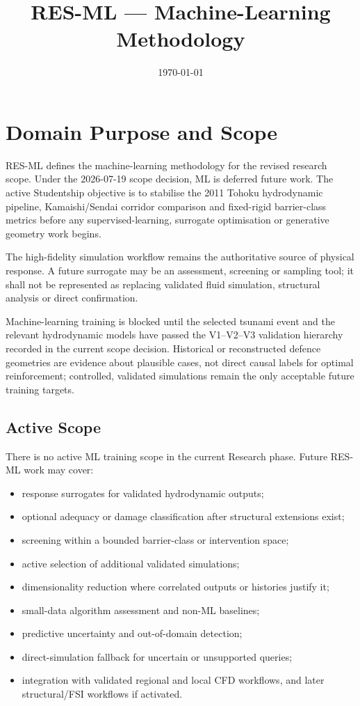 \documentclass[12pt,a4paper]{article}
\title{RES-ML --- Machine-Learning Methodology}
\author{}
\date{\today}
\begin{document}
\maketitle

\tableofcontents
\clearpage

\section{Domain Purpose and Scope}
\label{sec:res-ml-domain-purpose}

RES-ML defines the machine-learning methodology for the revised research
scope. Under the 2026-07-19 scope decision, ML is deferred future
work. The active Studentship objective is to stabilise the 2011
Tohoku hydrodynamic pipeline, Kamaishi/Sendai corridor comparison and
fixed-rigid barrier-class metrics before any supervised-learning,
surrogate optimisation or generative geometry work begins.

The high-fidelity simulation workflow remains the authoritative source of
physical response. A future surrogate may be an assessment, screening
or sampling tool; it shall not be represented as replacing validated
fluid simulation, structural analysis or direct confirmation.

Machine-learning training is blocked until the selected tsunami event and the
relevant hydrodynamic models have passed the V1--V2--V3 validation
hierarchy recorded in the current scope decision. Historical or
reconstructed defence geometries are evidence about plausible cases,
not direct causal labels for optimal reinforcement; controlled,
validated simulations remain the only acceptable future training
targets.

\subsection{Active Scope}
\label{sec:res-ml-active-scope}

There is no active ML training scope in the current Research phase.
Future RES-ML work may cover:
\begin{itemize}
  \item response surrogates for validated hydrodynamic outputs;
  \item optional adequacy or damage classification after structural
    extensions exist;
  \item screening within a bounded barrier-class or intervention space;
  \item active selection of additional validated simulations;
  \item dimensionality reduction where correlated outputs or histories justify
    it;
  \item small-data algorithm assessment and non-ML baselines;
  \item predictive uncertainty and out-of-domain detection;
  \item direct-simulation fallback for uncertain or unsupported queries;
  \item integration with validated regional and local CFD workflows,
    and later structural/FSI workflows if activated.
\end{itemize}
\end{document}
